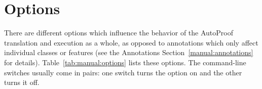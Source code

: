 \section{\AutoProof Options} \label{manual:options}

    There are different options which influence the behavior of the AutoProof translation and execution as a whole, as opposed to annotations which only affect individual classes or features (see the Annotations Section~\ref{manual:annotations} for details). Table~\ref{tab:manual:options} lists these options. The command-line switches usually come in pairs: one switch turns the option on and the other turns it off.

